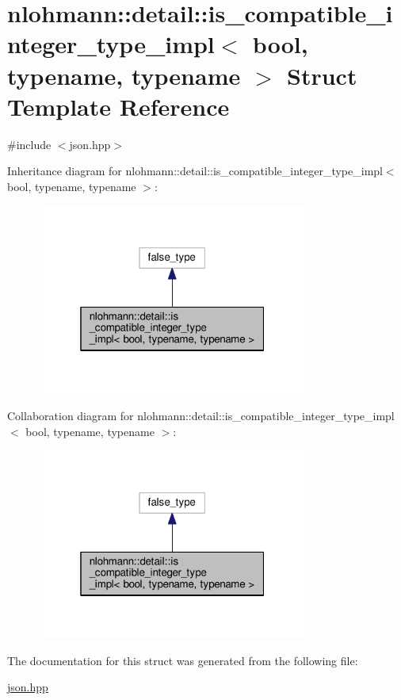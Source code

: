 \hypertarget{structnlohmann_1_1detail_1_1is__compatible__integer__type__impl}{}\section{nlohmann\+:\+:detail\+:\+:is\+\_\+compatible\+\_\+integer\+\_\+type\+\_\+impl$<$ bool, typename, typename $>$ Struct Template Reference}
\label{structnlohmann_1_1detail_1_1is__compatible__integer__type__impl}


{\ttfamily \#include $<$json.\+hpp$>$}



Inheritance diagram for nlohmann\+:\+:detail\+:\+:is\+\_\+compatible\+\_\+integer\+\_\+type\+\_\+impl$<$ bool, typename, typename $>$\+:\nopagebreak
\begin{figure}[H]
\begin{center}
\leavevmode
\includegraphics[width=253pt]{structnlohmann_1_1detail_1_1is__compatible__integer__type__impl__inherit__graph}
\end{center}
\end{figure}


Collaboration diagram for nlohmann\+:\+:detail\+:\+:is\+\_\+compatible\+\_\+integer\+\_\+type\+\_\+impl$<$ bool, typename, typename $>$\+:\nopagebreak
\begin{figure}[H]
\begin{center}
\leavevmode
\includegraphics[width=253pt]{structnlohmann_1_1detail_1_1is__compatible__integer__type__impl__coll__graph}
\end{center}
\end{figure}


The documentation for this struct was generated from the following file\+:\begin{DoxyCompactItemize}
\item 
\hyperlink{json_8hpp}{json.\+hpp}\end{DoxyCompactItemize}
